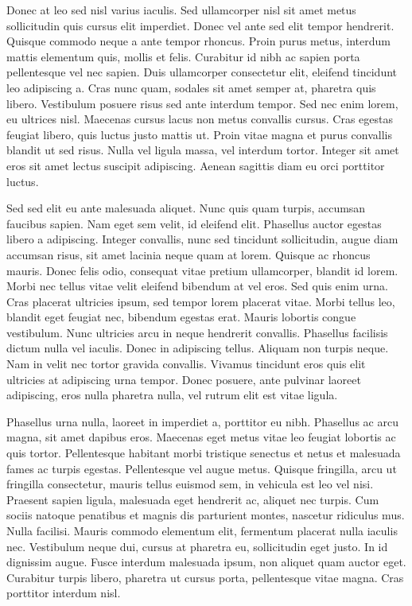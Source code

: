 \documentclass{ufbathesis}
\begin{document}
Donec at leo sed nisl varius iaculis. Sed ullamcorper nisl sit amet metus sollicitudin quis cursus elit imperdiet. Donec vel ante sed elit tempor hendrerit. Quisque commodo neque a ante tempor rhoncus. Proin purus metus, interdum mattis elementum quis, mollis et felis. Curabitur id nibh ac sapien porta pellentesque vel nec sapien. Duis ullamcorper consectetur elit, eleifend tincidunt leo adipiscing a. Cras nunc quam, sodales sit amet semper at, pharetra quis libero. Vestibulum posuere risus sed ante interdum tempor. Sed nec enim lorem, eu ultrices nisl. Maecenas cursus lacus non metus convallis cursus. Cras egestas feugiat libero, quis luctus justo mattis ut. Proin vitae magna et purus convallis blandit ut sed risus. Nulla vel ligula massa, vel interdum tortor. Integer sit amet eros sit amet lectus suscipit adipiscing. Aenean sagittis diam eu orci porttitor luctus.

Sed sed elit eu ante malesuada aliquet. Nunc quis quam turpis, accumsan faucibus sapien. Nam eget sem velit, id eleifend elit. Phasellus auctor egestas libero a adipiscing. Integer convallis, nunc sed tincidunt sollicitudin, augue diam accumsan risus, sit amet lacinia neque quam at lorem. Quisque ac rhoncus mauris. Donec felis odio, consequat vitae pretium ullamcorper, blandit id lorem. Morbi nec tellus vitae velit eleifend bibendum at vel eros. Sed quis enim urna. Cras placerat ultricies ipsum, sed tempor lorem placerat vitae. Morbi tellus leo, blandit eget feugiat nec, bibendum egestas erat. Mauris lobortis congue vestibulum. Nunc ultricies arcu in neque hendrerit convallis. Phasellus facilisis dictum nulla vel iaculis. Donec in adipiscing tellus. Aliquam non turpis neque. Nam in velit nec tortor gravida convallis. Vivamus tincidunt eros quis elit ultricies at adipiscing urna tempor. Donec posuere, ante pulvinar laoreet adipiscing, eros nulla pharetra nulla, vel rutrum elit est vitae ligula.

Phasellus urna nulla, laoreet in imperdiet a, porttitor eu nibh. Phasellus ac arcu magna, sit amet dapibus eros. Maecenas eget metus vitae leo feugiat lobortis ac quis tortor. Pellentesque habitant morbi tristique senectus et netus et malesuada fames ac turpis egestas. Pellentesque vel augue metus. Quisque fringilla, arcu ut fringilla consectetur, mauris tellus euismod sem, in vehicula est leo vel nisi. Praesent sapien ligula, malesuada eget hendrerit ac, aliquet nec turpis. Cum sociis natoque penatibus et magnis dis parturient montes, nascetur ridiculus mus. Nulla facilisi. Mauris commodo elementum elit, fermentum placerat nulla iaculis nec. Vestibulum neque dui, cursus at pharetra eu, sollicitudin eget justo. In id dignissim augue. Fusce interdum malesuada ipsum, non aliquet quam auctor eget. Curabitur turpis libero, pharetra ut cursus porta, pellentesque vitae magna. Cras porttitor interdum nisl.
\end{document}
